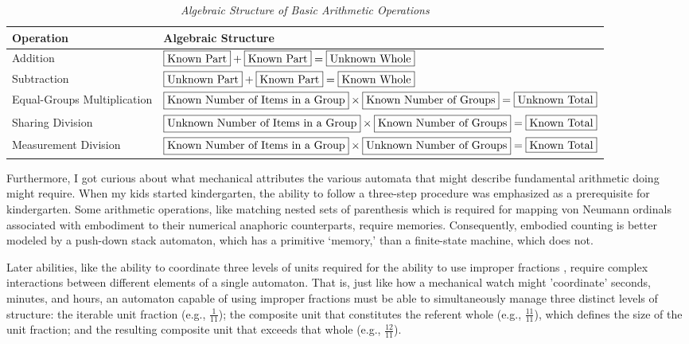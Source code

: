 \documentclass[12pt]{book}
\begin{document}
\begin{table}[h]
\centering
\caption{\textit{Algebraic Structure of Basic Arithmetic Operations}}
\label{tab:arithmetic-operations}
\begin{tabular}{@{}ll@{}}
\toprule
\textbf{Operation} & \textbf{Algebraic Structure} \\
\midrule
Addition & $\fbox{\text{Known Part}}+ \fbox{\text{Known Part}}= \fbox{\text{Unknown Whole}}$ \\[0.5ex]
Subtraction & $\fbox{\text{Unknown Part}}+ \fbox{\text{Known Part}}= \fbox{\text{Known Whole}}$ \\[0.5ex]
Equal-Groups Multiplication & $\fbox{\text{Known Number of Items in a Group}}\times \fbox{\text{Known Number of Groups}}= \fbox{\text{Unknown Total}}$ \\[0.5ex]
Sharing Division & $\fbox{\text{Unknown Number of Items in a Group}}\times \fbox{\text{Known Number of Groups}}= \fbox{\text{Known Total}}$ \\[0.5ex]
Measurement Division & $\fbox{\text{Known Number of Items in a Group}}\times \fbox{\text{Unknown Number of Groups}}= \fbox{\text{Known Total}}$ \\
\bottomrule
\end{tabular}
\end{table}

Furthermore, I got curious about what mechanical attributes the various automata that might describe fundamental arithmetic doing might require. When my kids started kindergarten, the ability to follow a three-step procedure was emphasized as a prerequisite for kindergarten. Some arithmetic operations, like matching nested sets of parenthesis which is required for mapping von Neumann ordinals associated with embodiment to their numerical anaphoric counterparts, require memories. Consequently, embodied counting is better modeled by a push-down stack automaton, which has a primitive `memory,' than a finite-state machine, which does not. 

Later abilities, like the ability to coordinate three levels of units required for the ability to use improper fractions \parencite{Hackenberg:2007aa}, require complex interactions between different elements of a single automaton. That is, just like how a mechanical watch might 'coordinate' seconds, minutes, and hours, an automaton capable of using improper fractions must be able to simultaneously manage three distinct levels of structure: the iterable unit fraction (e.g., $\frac{1}{11}$); the composite unit that constitutes the referent whole (e.g., $\frac{11}{11}$), which defines the size of the unit fraction; and the resulting composite unit that exceeds that whole (e.g., $\frac{12}{11}$).
\end{document}
